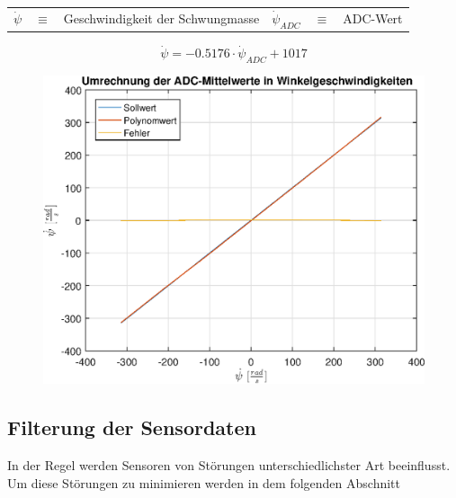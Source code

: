 \begin{table}[h!]
\centering
\begin{tabular}{lcllcl}
$\dot{\psi}$ & $\equiv$ & Geschwindigkeit der Schwungmasse & $\dot{\psi}_{ADC}$ & $\equiv$ & ADC-Wert
\end{tabular}
\end{table}

\begin{equation}
\dot{\psi} = -0.5176 \cdot \dot{\psi}_{ADC} + 1017
\end{equation}

\begin{figure}[h!]
\centering
	\includegraphics[width=0.5\linewidth]{img/ADC_mittelwert_polynom.eps}
\end{figure}

\subsection{Filterung der Sensordaten}
In der Regel werden Sensoren von Störungen unterschiedlichster Art beeinflusst. Um diese Störungen zu minimieren werden in dem folgenden Abschnitt 

